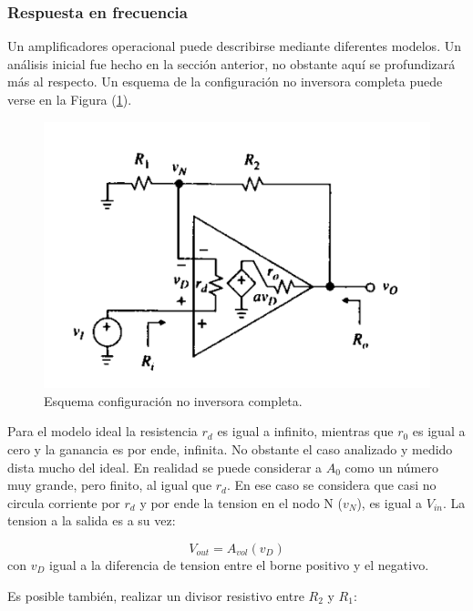 \subsubsection{Respuesta en frecuencia}

Un amplificadores operacional puede describirse mediante diferentes modelos. Un análisis inicial fue hecho en la sección anterior, no obstante aquí se profundizará más al respecto. Un esquema de la configuración no inversora completa puede verse en la Figura (\ref{fig:esquema_no_inversor}). 

\begin{figure}[H]	
	\centering
	\includegraphics[width=\textwidth]{Ejercicio2/Imagenes/Rin_no_inversor.png}
	\caption{Esquema configuración no inversora completa.}
	\label{fig:esquema_no_inversor}
\end{figure}

Para el modelo ideal la resistencia $r_d$ es igual a infinito, mientras que $r_0$ es igual a cero y la ganancia es por ende, infinita. No obstante el caso analizado y medido dista mucho del ideal. En realidad se puede considerar a $A_0$ como un número muy grande, pero finito, al igual que $r_d$. En ese caso se considera que casi no circula corriente por $r_d$ y por ende la tension en el nodo N ($v_N$), es igual a $V_{in}$. La tension a la salida es a su vez:

\begin{equation}\label{eq:ganancia}
V_{out} = A_{vol}(v_D)
\end{equation}
con $v_D$ igual a la diferencia de tension entre el borne positivo y el negativo. 

Es posible también, realizar un divisor resistivo entre $R_2$ y $R_1$:

